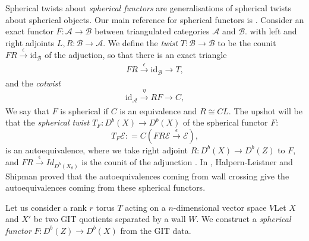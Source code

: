 \documentclass[oneside]{amsart}
\theoremstyle{definition}
\theoremstyle{definition}
\theoremstyle{definition}
\theoremstyle{definition}
\newcommand{\defeq}{\mathrel{\mathop:}=}
\newcommand{\Es}{\mathcal{E}}
\begin{document}
Spherical twists about \textit{spherical functors} are generalisations of spherical twists about spherical objects. Our main reference for spherical functors is \cite[text]{spherical}. Consider an exact functor $F : \mathcal{A} \to \mathcal{B}$ between triangulated categories $\mathcal{A}$ and $\mathcal{B}$. with left and right adjoints $L, R : \mathcal{B} \to \mathcal{A}$. We define the \textit{twist} $T : \mathcal{B} \to \mathcal{B}$  to be the counit $FR \xrightarrow[]{\epsilon} \text{id}_\mathcal{B}$ of the adjuction, so that there is an exact triangle 
\begin{equation}
     FR \xrightarrow[]{\epsilon} \text{id}_\mathcal{B}\xrightarrow{} T,
\end{equation}  
and the \textit{cotwist} 
\begin{equation}
    \text{id}_\mathcal{A} \xrightarrow[]{\eta}  RF \xrightarrow{} C,
\end{equation}  
We say that $F$ is spherical if $C$ is an
equivalence and $R \cong CL$.
The upshot will be that the \textit{spherical twist} $T_F: D^b(X) \to D^b(X)$ of the spherical functor $F$:
\begin{equation}
    T_F \Es \defeq C \left( FR \Es \xrightarrow[]{\epsilon} \Es \right),
\end{equation}   
is an autoequivalence, where we take right adjoint $R : D^b(X) \to D^b(Z)$ to $F$, and $FR \xrightarrow[]{\epsilon} Id_{D^b(X_\theta)}$ is the counit of the adjunction \cite[Section 1]{spherical}. In \cite{gitauto}, Halpern-Leistner and Shipman proved that the autoequivalences coming from wall crossing give the autoequivalences coming from these spherical functors.

Let us consider a rank $r$ torus $T$ acting on a $n$-dimensional vector space $V$Let $X$ and $X'$ be two GIT quotients separated by a wall $W$. We construct a \textit{spherical functor} $F : D^b(Z) \to D^b(X) $ from the GIT data.
\end{document}
